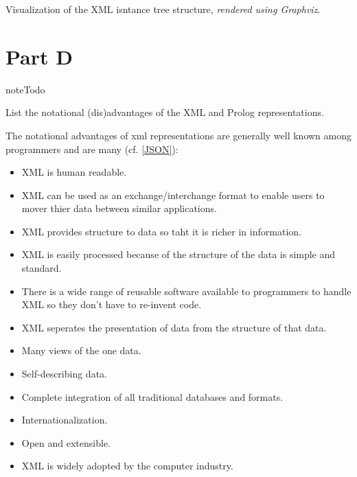 \documentclass[letterpaper,10pt,english]{sphinxmanual}
\begin{document}
Visualization of the XML isntance tree structure, \emph{rendered using Graphviz}.


\section{Part D}
\label{assign0:part-d}
\begin{notice}{note}{Todo}

List the notational (dis)advantages of the XML and Prolog representations.
\end{notice}

The notational advantages of xml representations are generally well known among programmers and are many (cf. {\hyperref[assign0:json]{{[}JSON{]}}}):
\begin{itemize}
\item {} 
XML is human readable.

\item {} 
XML can be used as an exchange/interchange format to enable users to mover thier data between similar applications.

\item {} 
XML provides structure to data so taht it is richer in information.

\item {} 
XML is easily processed because of the structure of the data is simple and standard.

\item {} 
There is a wide range of reusable software available to programmers to handle XML so they don't have to re-invent code.

\item {} 
XML seperates the presentation of data from the structure of that data.

\item {} 
Many views of the one data.

\item {} 
Self-describing data.

\item {} 
Complete integration of all traditional databases and formats.

\item {} 
Internationalization.

\item {} 
Open and extensible.

\item {} 
XML is widely adopted by the computer industry.

\end{itemize}
\end{document}
